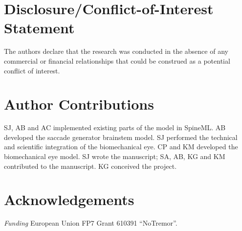 \documentclass{frontiersSCNS}
\begin{document}

\section*{Disclosure/Conflict-of-Interest Statement}

The authors declare that the research was conducted in the absence of
any commercial or financial relationships that could be construed as a
potential conflict of interest.

\section*{Author Contributions}

SJ, AB and AC implemented existing parts of the model in SpineML. AB
developed the saccade generator brainstem model. SJ performed the
technical and scientific integration of the biomechanical eye.  CP and
KM developed the biomechanical eye model. SJ wrote the manuscript; SA,
AB, KG and KM contributed to the manuscript. KG conceived the
project.

\section*{Acknowledgements}

\textit{Funding\textcolon} European Union FP7 Grant 610391 ``NoTremor''.
\end{document}
